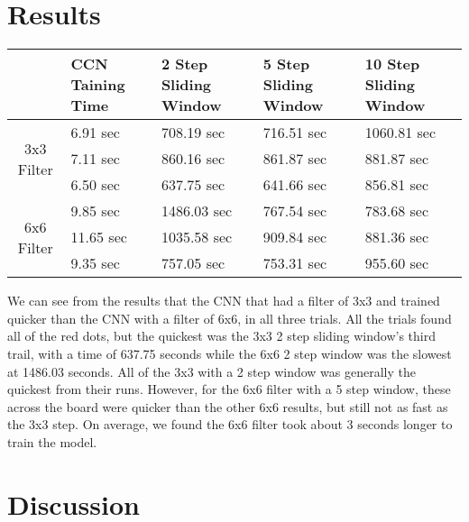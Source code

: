 \documentclass[a4paper,10pt]{article}
\begin{document}

\section{Results}
\begin{center}
	\begin{tabular}{ |c|p{1.5cm}|p{2.25cm}|p{2.25cm}|p{2.25cm}| } 
		\hline
		 & CCN Taining Time & 2 Step Sliding Window & 5 Step Sliding Window & 10 Step Sliding Window \\
		\hline
		\multirow{3}{4em}{3x3 Filter} & 6.91 sec & 708.19 sec & 716.51 sec & 1060.81 sec \\ 
		
		& 7.11 sec & 860.16 sec & 861.87 sec & 881.87 sec  \\ 
		& 6.50 sec & 637.75 sec & 641.66 sec & 856.81 sec \\ 
		\hline
		\multirow{3}{4em}{6x6 Filter} & 9.85 sec & 1486.03 sec & 767.54 sec & 783.68 sec \\ 
		& 11.65 sec & 1035.58 sec & 909.84 sec & 881.36 sec \\ 
		& 9.35 sec & 757.05 sec & 753.31 sec & 955.60 sec \\ 
		\hline
	\end{tabular}
\end{center}

We can see from the results that the CNN that had a filter of 3x3 and trained quicker than the CNN with a filter of 6x6, in all three trials. All the trials found all of the red dots, but the quickest was the 3x3 2 step sliding window's third trail, with a time of 637.75 seconds while the 6x6 2 step window was the slowest at 1486.03 seconds. All of the 3x3 with a 2 step window was generally the quickest from their runs. However, for the 6x6 filter with a 5 step window, these across the board were quicker than the other 6x6 results, but still not as fast as the 3x3 step. On average, we found the 6x6 filter took about 3 seconds longer to train the model.

\section{Discussion}
\end{document}
